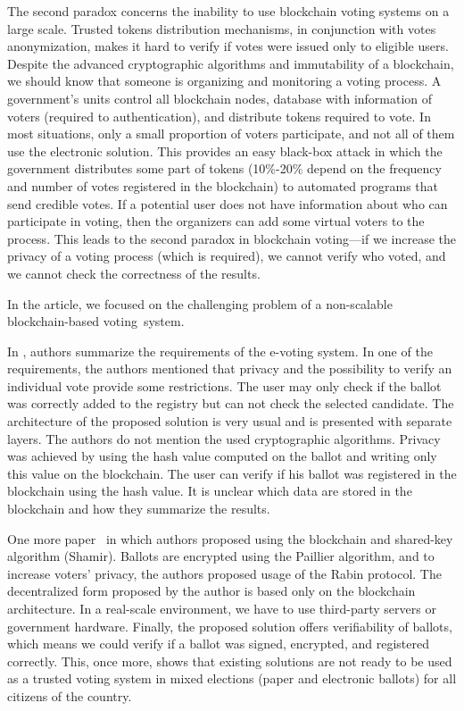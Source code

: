 \documentclass[applsci,article,accept,moreauthors,pdftex]{Definitions/mdpi}
\begin{document}
The second paradox concerns the inability to use blockchain voting systems on a large scale. Trusted tokens distribution mechanisms, in conjunction with votes anonymization, makes it hard to verify if votes were issued only to eligible users. Despite the advanced cryptographic algorithms and immutability of a blockchain, we should know that someone is organizing and monitoring a voting process. A government's units control all blockchain nodes, database with information of voters (required to authentication), and distribute tokens required to vote. In most situations, only a small proportion of voters participate, and not all of them use the electronic solution. This provides an easy black-box attack in which the government distributes some part of tokens (10\%-20\% depend on the frequency and number of votes registered in the blockchain) to automated programs that send credible votes. If a potential user does not have information about who can participate in voting, then the organizers can add some virtual voters to the process. This leads to the second paradox in blockchain voting––if we increase the privacy of a voting process (which is required), we cannot verify who voted, and we cannot check the correctness of the results. 

In the article, we focused on the challenging problem of a non-scalable blockchain-based voting~system.

In \cite{khan2018secure}, authors summarize the requirements of the e-voting system. In one of the requirements, the authors mentioned that privacy and the possibility to verify an individual vote provide some restrictions. The user may only check if the ballot was correctly added to the registry but can not check the selected candidate. The architecture of the proposed solution is very usual and is presented with separate layers. The authors do not mention the used cryptographic algorithms. Privacy was achieved by using the hash value computed on the ballot and writing only this value on the blockchain. The user can verify if his ballot was registered in the blockchain using the hash value. It is unclear which data are stored in the blockchain and how they summarize the results.

One more paper~\cite{hsiao2017decentralized} in which authors proposed using the blockchain and shared-key algorithm (Shamir). Ballots are encrypted using the Paillier algorithm, and to increase voters' privacy, the authors proposed usage of the Rabin protocol. The decentralized form proposed by the author is based only on the blockchain architecture. In a real-scale environment, we have to use third-party servers or government hardware. Finally, the proposed solution offers verifiability of ballots, which means we could verify if a ballot was signed, encrypted, and registered correctly. This, once more, shows that existing solutions are not ready to be used as a trusted voting system in mixed elections (paper and electronic ballots) for all citizens of the country. 
\end{document}
